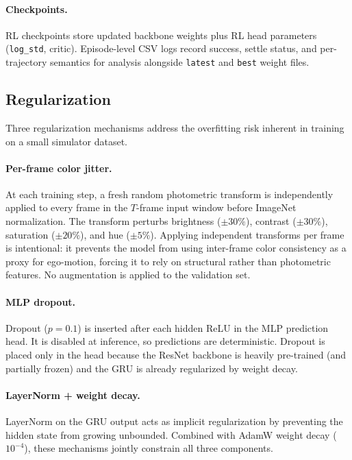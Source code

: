 \documentclass[10pt,twocolumn,letterpaper]{article}
\begin{document}
\paragraph{Checkpoints.} RL checkpoints store updated backbone weights plus RL head parameters (\texttt{log\_std}, critic). Episode-level CSV logs record success, settle status, and per-trajectory semantics for analysis alongside \texttt{latest} and \texttt{best} weight files.

\subsection{Regularization}

Three regularization mechanisms address the overfitting risk inherent in training on a small simulator dataset.

\paragraph{Per-frame color jitter.} At each training step, a fresh random photometric transform is independently applied to every frame in the $T$-frame input window before ImageNet normalization. The transform perturbs brightness ($\pm30\%$), contrast ($\pm30\%$), saturation ($\pm20\%$), and hue ($\pm5\%$). Applying independent transforms per frame is intentional: it prevents the model from using inter-frame color consistency as a proxy for ego-motion, forcing it to rely on structural rather than photometric features. No augmentation is applied to the validation set.

\paragraph{MLP dropout.} Dropout ($p{=}0.1$) is inserted after each hidden ReLU in the MLP prediction head. It is disabled at inference, so predictions are deterministic. Dropout is placed only in the head because the ResNet backbone is heavily pre-trained (and partially frozen) and the GRU is already regularized by weight decay.

\paragraph{LayerNorm + weight decay.} LayerNorm on the GRU output acts as implicit regularization by preventing the hidden state from growing unbounded. Combined with AdamW weight decay ($10^{-4}$), these mechanisms jointly constrain all three components.
\end{document}
